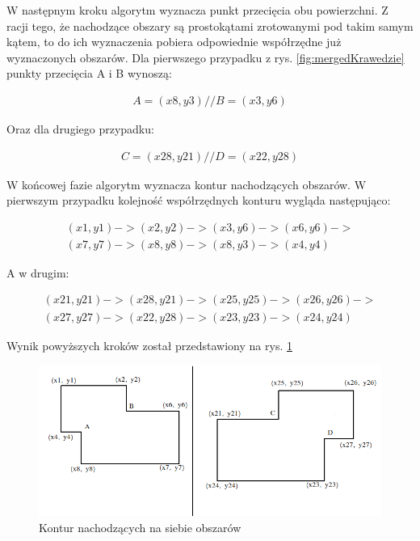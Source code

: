 W następnym kroku algorytm wyznacza punkt przecięcia obu powierzchni. Z racji tego, że nachodzące obszary są prostokątami zrotowanymi pod takim samym kątem, to do ich wyznaczenia pobiera odpowiednie współrzędne już wyznaczonych obszarów. Dla pierwszego przypadku z rys. \ref{fig:mergedKrawedzie} punkty przecięcia A i B wynoszą:

\begin{equation}
\begin{split}
A = (x8, y3) //
B = (x3, y6)
\end{split}
\end{equation}

Oraz dla drugiego przypadku:

\begin{equation}
\begin{split}
C = (x28, y21) //
D = (x22, y28)
\end{split}
\end{equation}

W końcowej fazie algorytm wyznacza kontur nachodzących obszarów. W pierwszym przypadku kolejność współrzędnych konturu wygląda następująco:
 
\begin{equation}
\begin{split}
(x1, y1) -> (x2, y2) -> (x3, y6) -> (x6, y6) ->  \\
(x7, y7) -> (x8, y8) -> (x8, y3) -> (x4, y4)
\end{split}
\end{equation}

A w drugim: 

\begin{equation}
\begin{split}
(x21, y21) -> (x28, y21) -> (x25, y25) -> (x26, y26) ->  \\
(x27, y27) -> (x22, y28) -> (x23, y23) -> (x24, y24)
\end{split}
\end{equation}

Wynik powyższych kroków został przedstawiony na rys. \ref{fig:mergedKrawedzieKontur}

\begin{figure}[h]
\caption{Kontur nachodzących na siebie obszarów}
\label{fig:mergedKrawedzieKontur}
\centering
\includegraphics[width=1.1\textwidth]{mergedKrawedzieKontur}
\end{figure}


